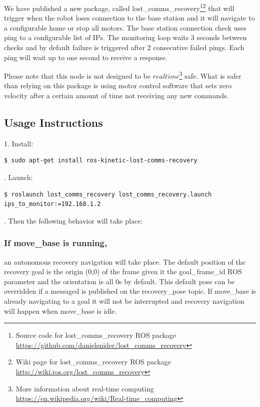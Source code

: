 \documentclass[runningheads,a4paper]{llncs}
\begin{document}
We have published a new package, called lost\_comms\_recovery\footnote{Source code for lost\_comms\_recovery ROS package \url{https://github.com/danielsnider/lost_comms_recovery}}\footnote{Wiki page for lost\_comms\_recovery ROS package \url{http://wiki.ros.org/lost_comms_recovery}} that will trigger when the robot loses connection to the base station and it will navigate to a configurable home or stop all motors. The base station connection check uses ping to a configurable list of IPs. The monitoring loop waits 3 seconds between checks and by default failure is triggered after 2 consecutive failed pings. Each ping will wait up to one second to receive a response. 

Please note that this node is not designed to be $realtime$\footnote{More information about real-time computing \url{https://en.wikipedia.org/wiki/Real-time_computing}} safe. What is safer than relying on this package is using motor control software that sets zero velocity after a certain amount of time not receiving any new commands.

\subsection{Usage Instructions}

1. Install:

\begin{lstlisting}[frame=single,basicstyle=\ttfamily\footnotesize,breaklines=true]
$ sudo apt-get install ros-kinetic-lost-comms-recovery
\end{lstlisting}

. Launch:

\begin{lstlisting}[frame=single,basicstyle=\ttfamily\footnotesize,breaklines=true]
$ roslaunch lost_comms_recovery lost_comms_recovery.launch ips_to_monitor:=192.168.1.2
\end{lstlisting}

. Then the following behavior will take place:

\subsubsection*{If move\_base is running,} an autonomous recovery navigation will take place. The default position of the recovery goal is the origin (0,0) of the frame given it the goal\_frame\_id ROS parameter and the orientation is all 0s by default. This default pose can be overridden if a messaged is published on the recovery\_pose topic. If move\_base is already navigating to a goal it will not be interrupted and recovery navigation will happen when move\_base is idle.
\end{document}
